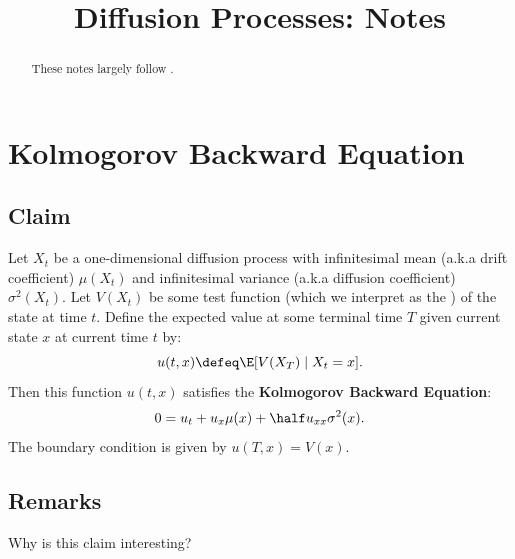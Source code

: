 \documentclass{article} %
\title{Diffusion Processes: Notes}
\begin{document}
\maketitle

\begin{abstract}
These notes largely follow \citet[Chapter 6]{chang2007stochastic}.

\end{abstract}

\section{Kolmogorov Backward Equation}

\subsection{Claim} \label{sec:claim}

Let $X_t$ be a one-dimensional diffusion process with infinitesimal mean (a.k.a drift coefficient) $\mu(X_t)$ and infinitesimal variance (a.k.a diffusion coefficient) $\sigma^2(X_t)$. Let $V(X_t)$ be some test function (which we interpret as the ) of the state at time $t$.   Define the expected value at some terminal time $T$ given   current state $x$ at current time $t$  by:
\[ u(t,x) \defeq \E[V(X_T) \mid X_t = x]. \]
Then this function $u(t,x)$ satisfies the \textbf{Kolmogorov Backward Equation}:
 \[ 0 = u_t + u_x \mu(x) + \half u_{xx} \sigma^2(x).  \]
The boundary condition is given by $u(T,x)=V(x)$.
\subsection{Remarks}



Why is this claim interesting?  
\end{document}
